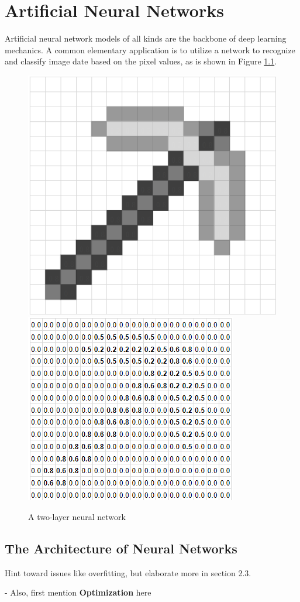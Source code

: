 \chapter{Artificial Neural Networks}



Artificial neural network models of all kinds are the backbone of deep learning mechanics.  A common elementary application is to utilize a network to recognize and classify image date based on the pixel values, as is shown in Figure \ref{minecraft}.  


\begin{figure}[H]
    \centering
    \includegraphics[width=.35\textwidth]{Figures/pickaxe_1.png}
    \hspace{30pt}
    \includegraphics[width=.35\textwidth]{Figures/pickaxe_2.png}
    \caption{\footnotesize{A two-layer neural network}}
    \label{minecraft}
\end{figure}





\section{The Architecture of Neural Networks} %

Hint toward issues like overfitting, but elaborate more in section 2.3.

- Also, first mention \textbf{Optimization} here




